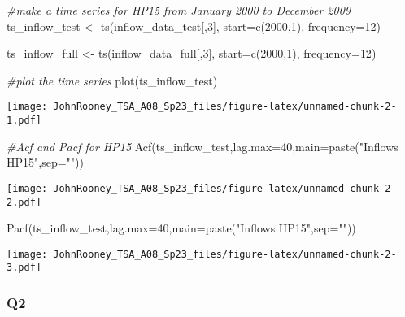 \documentclass[
]{article}
\newenvironment{Shaded}{\begin{snugshade}}{\end{snugshade}}
\newcommand{\AttributeTok}[1]{\textcolor[rgb]{0.77,0.63,0.00}{#1}}
\newcommand{\CommentTok}[1]{\textcolor[rgb]{0.56,0.35,0.01}{\textit{#1}}}
\newcommand{\DecValTok}[1]{\textcolor[rgb]{0.00,0.00,0.81}{#1}}
\newcommand{\FunctionTok}[1]{\textcolor[rgb]{0.00,0.00,0.00}{#1}}
\newcommand{\NormalTok}[1]{#1}
\newcommand{\OtherTok}[1]{\textcolor[rgb]{0.56,0.35,0.01}{#1}}
\newcommand{\StringTok}[1]{\textcolor[rgb]{0.31,0.60,0.02}{#1}}
\begin{document}
\begin{Shaded}
\begin{Highlighting}[]
\CommentTok{\#make a time series for HP15 from January 2000 to December 2009}
\NormalTok{ts\_inflow\_test }\OtherTok{\textless{}{-}} \FunctionTok{ts}\NormalTok{(inflow\_data\_test[,}\DecValTok{3}\NormalTok{], }\AttributeTok{start=}\FunctionTok{c}\NormalTok{(}\DecValTok{2000}\NormalTok{,}\DecValTok{1}\NormalTok{), }\AttributeTok{frequency=}\DecValTok{12}\NormalTok{) }

\NormalTok{ts\_inflow\_full }\OtherTok{\textless{}{-}} \FunctionTok{ts}\NormalTok{(inflow\_data\_full[,}\DecValTok{3}\NormalTok{], }\AttributeTok{start=}\FunctionTok{c}\NormalTok{(}\DecValTok{2000}\NormalTok{,}\DecValTok{1}\NormalTok{), }\AttributeTok{frequency=}\DecValTok{12}\NormalTok{)}

\CommentTok{\#plot the time series}
\FunctionTok{plot}\NormalTok{(ts\_inflow\_test)}
\end{Highlighting}
\end{Shaded}

\texttt{[image: JohnRooney\_TSA\_A08\_Sp23\_files/figure-latex/unnamed-chunk-2-1.pdf]}

\begin{Shaded}
\begin{Highlighting}[]
\CommentTok{\#Acf and Pacf for HP15}
\FunctionTok{Acf}\NormalTok{(ts\_inflow\_test,}\AttributeTok{lag.max=}\DecValTok{40}\NormalTok{,}\AttributeTok{main=}\FunctionTok{paste}\NormalTok{(}\StringTok{"Inflows HP15"}\NormalTok{,}\AttributeTok{sep=}\StringTok{""}\NormalTok{)) }
\end{Highlighting}
\end{Shaded}

\texttt{[image: JohnRooney\_TSA\_A08\_Sp23\_files/figure-latex/unnamed-chunk-2-2.pdf]}

\begin{Shaded}
\begin{Highlighting}[]
\FunctionTok{Pacf}\NormalTok{(ts\_inflow\_test,}\AttributeTok{lag.max=}\DecValTok{40}\NormalTok{,}\AttributeTok{main=}\FunctionTok{paste}\NormalTok{(}\StringTok{"Inflows HP15"}\NormalTok{,}\AttributeTok{sep=}\StringTok{""}\NormalTok{))}
\end{Highlighting}
\end{Shaded}

\texttt{[image: JohnRooney\_TSA\_A08\_Sp23\_files/figure-latex/unnamed-chunk-2-3.pdf]}

\hypertarget{q2}{%
\subsubsection{Q2}\label{q2}}
\end{document}
